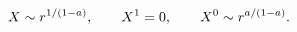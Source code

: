 \begin{equation}
\hspace*{-0.5truecm}X\sim r^{1/(1-a)},\qquad X^1=0,\qquad X^0\sim r^{a/(1-a)}.
\label{Xr}
\end{equation}

